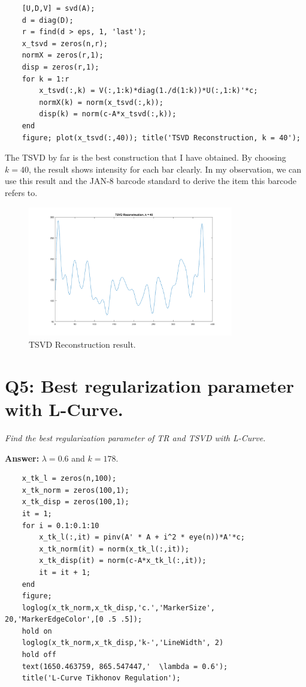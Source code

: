 \documentclass[a4paper,12pt]{article}
\begin{document}
\vspace{2em}
\begin{lstlisting}[caption={MATLAB code for TSVD with $k = 40$.}]
	% TSVD  
	[U,D,V] = svd(A);
	d = diag(D);
	r = find(d > eps, 1, 'last');
	x_tsvd = zeros(n,r);
	normX = zeros(r,1);
	disp = zeros(r,1);
	for k = 1:r
		x_tsvd(:,k) = V(:,1:k)*diag(1./d(1:k))*U(:,1:k)'*c;
		normX(k) = norm(x_tsvd(:,k));
		disp(k) = norm(c-A*x_tsvd(:,k));
	end
	figure; plot(x_tsvd(:,40)); title('TSVD Reconstruction, k = 40');
\end{lstlisting}
\vspace{2em}

The TSVD by far is the best construction that I have obtained. By choosing $k=40$, the result shows intensity for each bar clearly. In my observation, we can use this result and the JAN-8 barcode standard to derive the item this barcode refers to.

\begin{figure}[H]
	\centering
	\includegraphics[width=0.8\textwidth]{TSVD_graph.png}
	\caption{TSVD Reconstruction result.}
	\label{fig:tsvd}
\end{figure}

\vspace{-2em}
\section*{Q5: Best regularization parameter with L-Curve.}
\setcounter{section}{1}

\textit{Find the best regularization parameter of TR and TSVD with L-Curve.} 

\vspace{1em}
\noindent
\textbf{Answer:} $\lambda = 0.6$ and $k = 178$.
\vspace{-1em}
\noindent

\begin{lstlisting}[caption={MATLAB code for ploting Tikhonov Regularization L-Curve.}]
	% L-Curve Tikhonov
	x_tk_l = zeros(n,100);
	x_tk_norm = zeros(100,1);
	x_tk_disp = zeros(100,1);
	it = 1;
	for i = 0.1:0.1:10
	    x_tk_l(:,it) = pinv(A' * A + i^2 * eye(n))*A'*c;
	    x_tk_norm(it) = norm(x_tk_l(:,it));
	    x_tk_disp(it) = norm(c-A*x_tk_l(:,it));
	    it = it + 1;
	end
	figure;
	loglog(x_tk_norm,x_tk_disp,'c.','MarkerSize', 20,'MarkerEdgeColor',[0 .5 .5]);
	hold on
	loglog(x_tk_norm,x_tk_disp,'k-','LineWidth', 2)
	hold off
	text(1650.463759, 865.547447,'  \lambda = 0.6');
	title('L-Curve Tikhonov Regulation');
\end{lstlisting}
\end{document}
